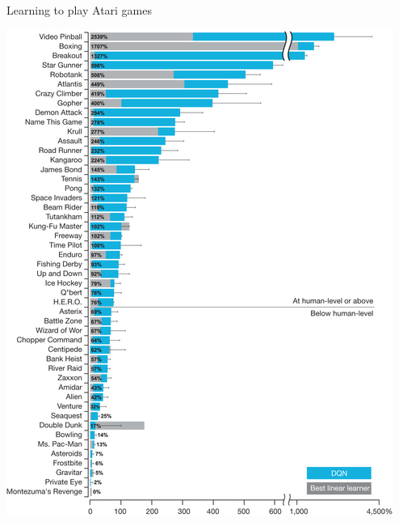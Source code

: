\begin{frame}{Learning to play Atari games}
    \begin{center}
    	\includegraphics[height=0.8\textheight]{deepmind_atari_graph}
	\end{center}
\end{frame}


